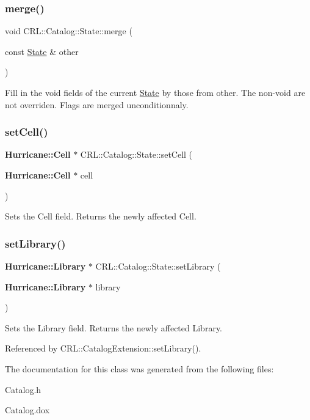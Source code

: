 \subsubsection{\texorpdfstring{merge()}{merge()}}
{\footnotesize\ttfamily void C\+R\+L\+::\+Catalog\+::\+State\+::merge (\begin{DoxyParamCaption}\item[{const \mbox{\hyperlink{classCRL_1_1Catalog_1_1State}{State}} \&}]{other }\end{DoxyParamCaption})\hspace{0.3cm}{\ttfamily [inline]}}

Fill in the void fields of the current \mbox{\hyperlink{classCRL_1_1Catalog_1_1State}{State}} by those from {\ttfamily other}. The non-\/void are not overriden. Flags are merged unconditionnaly. \mbox{\label{classCRL_1_1Catalog_1_1State_a156714ad3fe2e5bb8ad8549d101526fe}} 
\subsubsection{\texorpdfstring{set\+Cell()}{setCell()}}
{\footnotesize\ttfamily \textbf{ Hurricane\+::\+Cell} $\ast$ C\+R\+L\+::\+Catalog\+::\+State\+::set\+Cell (\begin{DoxyParamCaption}\item[{\textbf{ Hurricane\+::\+Cell} $\ast$}]{cell }\end{DoxyParamCaption})}

Sets the Cell field. Returns the newly affected Cell. \mbox{\label{classCRL_1_1Catalog_1_1State_a821ac2ae33f0045232cab612ab12f84b}} 
\subsubsection{\texorpdfstring{set\+Library()}{setLibrary()}}
{\footnotesize\ttfamily \textbf{ Hurricane\+::\+Library} $\ast$ C\+R\+L\+::\+Catalog\+::\+State\+::set\+Library (\begin{DoxyParamCaption}\item[{\textbf{ Hurricane\+::\+Library} $\ast$}]{library }\end{DoxyParamCaption})\hspace{0.3cm}{\ttfamily [inline]}}

Sets the Library field. Returns the newly affected Library. 

Referenced by C\+R\+L\+::\+Catalog\+Extension\+::set\+Library().



The documentation for this class was generated from the following files\+:\begin{DoxyCompactItemize}
\item 
Catalog.\+h\item 
Catalog.\+dox\end{DoxyCompactItemize}

